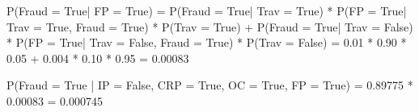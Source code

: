 \documentclass[11pt]{article}
\begin{document}
\begin{enumerate}
        P(Fraud = True| FP = True) = P(Fraud = True| Trav = True) * P(FP = True| Trav = True, Fraud = True) * P(Trav = True) + P(Fraud = True| Trav = False) * P(FP = True| Trav = False, Fraud = True) * P(Trav = False) = 0.01 * 0.90 * 0.05 + 0.004 * 0.10 * 0.95 = 0.00083
        
        P(Fraud = True | IP = False, CRP = True, OC = True, FP = True) = 0.89775 * 0.00083 = 0.000745
    \end{enumerate}
\end{document}
